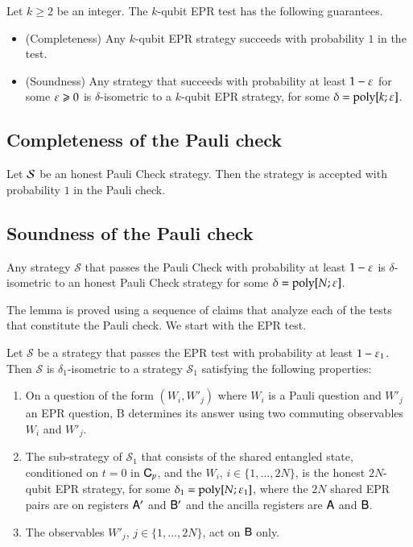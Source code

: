 \begin{theorem}\label{thm:epr-test}
Let $k \geq 2$ be an integer. The $k$-qubit EPR test has the following guarantees. 
\begin{itemize}
\item (Completeness) Any $k$-qubit EPR strategy succeeds with probability $1$ in the test. 
\item (Soundness) Any strategy that succeeds with probability at least $1-\varepsilon$ for some $\varepsilon\geqslant 0$ is $\delta$-isometric to a $k$-qubit EPR strategy, for some $\delta = \operatorname{poly}[k;\varepsilon]$. 
\end{itemize}
\end{theorem}

\subsection{Completeness of the Pauli check}

\begin{lemma}\label{lem:paulicheck-compleness}
Let $\mathcal{S}$ be an honest Pauli Check strategy. Then the strategy is accepted with probability $1$ in the Pauli check.
\end{lemma}


\subsection{Soundness of the Pauli check}

\begin{lemma}\label{lem:paulicheck-soundness}
Any strategy $\mathcal{S}$ that passes the Pauli Check with probability at least $1 - \varepsilon$ is $\delta$-isometric to an honest Pauli Check strategy for some $\delta = \operatorname{poly}[N;\varepsilon]$.
\end{lemma}

The lemma is proved using a sequence of claims that analyze each of the tests that constitute the Pauli check. We start with the EPR test. 

\begin{claim}\label{claim:pauli-epr}
Let $\mathcal{S}$ be a strategy that passes the EPR test with probability at least $1 - \varepsilon_1$. Then $\mathcal{S}$ is $\delta_1$-isometric to a strategy $\mathcal{S}_1$ satisfying the following properties:
\begin{enumerate}
\item On a question of the form $(W_i,W'_j)$ where $W_i$ is a Pauli question and $W'_j$ an EPR question, B determines its answer using two commuting observables $W_i$ and $W'_j$. 
\item The sub-strategy of $\mathcal{S}_1$ that consists of the shared entangled state, conditioned on $t=0$ in ${\mathsf{C}}_p$, and the $W_i$, $i\in\{1,\ldots,2N\}$, is the honest $2N$-qubit EPR strategy, for some $\delta_1 = \operatorname{poly}[N;\varepsilon_1]$, where the $2N$ shared EPR pairs are on registers ${\mathsf{A}}'$ and ${\mathsf{B}}'$ and the ancilla registers are ${\mathsf{A}}$ and ${\mathsf{B}}$. 
\item The observables $W'_j$, $j\in\{1,\ldots,2N\}$, act on ${\mathsf{B}}$ only. 
\end{enumerate}
\end{claim}

